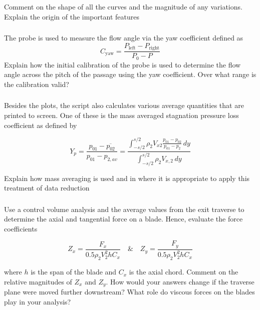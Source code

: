 \documentclass{article}
\begin{document}
Comment on the shape of all the curves and the magnitude of any variations. Explain the origin
of the important features

\subsubsection{}
The probe is used to measure the flow angle via the yaw coefficient defined as
\begin{equation}
    C_\text{yaw} = \frac{P_\text{left} - P_\text{right}}{P_0 - P}
\end{equation}
Explain how the initial calibration of the probe is used to determine the flow angle across the
pitch of the passage using the yaw coefficient. Over what range is the calibration valid?

\subsubsection{}
Besides the plots, the script also calculates various average quantities that are printed
to screen. One of these is the mass averaged stagnation pressure loss coefficient as defined by

\begin{equation}
    Y_p = \frac{p_{01} - \overline{p_{02}}}{p_{01} - p_{2,av}} = \frac{\int_{-s/2}^{s/2} \rho_2 V_{x2} \frac{p_{01} - p_{02}}{p_{01} - p_2} \, dy}{\int_{-s/2}^{s/2} \rho_2 V_{x,2} \, dy}
\end{equation}

Explain how mass averaging is used and in where it is appropriate to apply this treatment of
data reduction

\subsubsection{}
Use a control volume analysis and the average values from the exit traverse to determine
the axial and tangential force on a blade. Hence, evaluate the force coefficients

\begin{equation}
    Z_x = \frac{F_x}{0.5 \rho_2 V_2^2 h C_x} \quad \& \quad Z_y = \frac{F_y}{0.5 \rho_2 V_2^2 h C_x}
\end{equation}

where $h$ is the span of the blade and $C_x$ is the axial chord. Comment on the relative magnitudes
of $Z_x$ and $Z_y$. How would your answers change if the traverse plane were moved further
downstream? What role do viscous forces on the blades play in your analysis?
\end{document}
